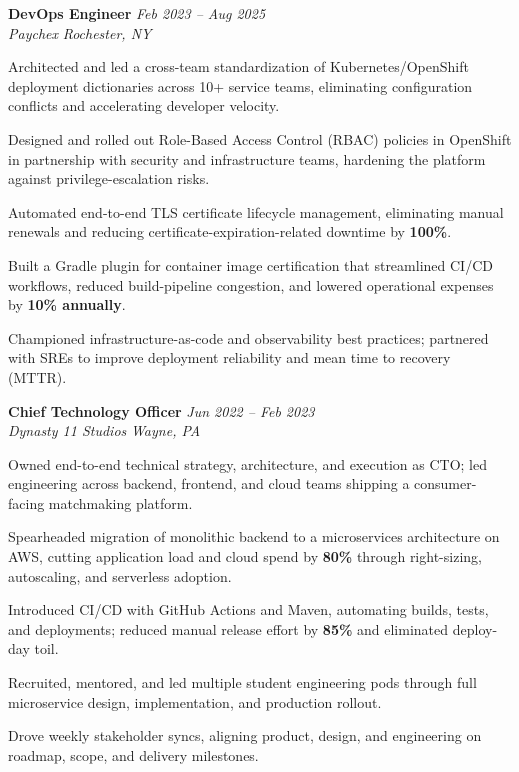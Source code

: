 \documentclass[letterpaper,10pt]{article}
\newcommand{\role}[4]{%
  \textbf{#1} \hfill \textit{#3}\\[-1pt]
  \textit{#2} \hfill \textit{#4}\par\vspace{2pt}
}
\begin{document}
\role{DevOps Engineer}{Paychex}{Feb 2023 -- Aug 2025}{Rochester, NY}
\begin{tightitemize}
  \item Architected and led a cross-team standardization of Kubernetes/OpenShift deployment dictionaries across 10+ service teams, eliminating configuration conflicts and accelerating developer velocity.
  \item Designed and rolled out Role-Based Access Control (RBAC) policies in OpenShift in partnership with security and infrastructure teams, hardening the platform against privilege-escalation risks.
  \item Automated end-to-end TLS certificate lifecycle management, eliminating manual renewals and reducing certificate-expiration-related downtime by \textbf{100\%}.
  \item Built a Gradle plugin for container image certification that streamlined CI/CD workflows, reduced build-pipeline congestion, and lowered operational expenses by \textbf{10\% annually}.
  \item Championed infrastructure-as-code and observability best practices; partnered with SREs to improve deployment reliability and mean time to recovery (MTTR).
\end{tightitemize}

\role{Chief Technology Officer}{Dynasty 11 Studios}{Jun 2022 -- Feb 2023}{Wayne, PA}
\begin{tightitemize}
  \item Owned end-to-end technical strategy, architecture, and execution as CTO; led engineering across backend, frontend, and cloud teams shipping a consumer-facing matchmaking platform.
  \item Spearheaded migration of monolithic backend to a microservices architecture on AWS, cutting application load and cloud spend by \textbf{80\%} through right-sizing, autoscaling, and serverless adoption.
  \item Introduced CI/CD with GitHub Actions and Maven, automating builds, tests, and deployments; reduced manual release effort by \textbf{85\%} and eliminated deploy-day toil.
  \item Recruited, mentored, and led multiple student engineering pods through full microservice design, implementation, and production rollout.
  \item Drove weekly stakeholder syncs, aligning product, design, and engineering on roadmap, scope, and delivery milestones.
\end{tightitemize}
\end{document}
